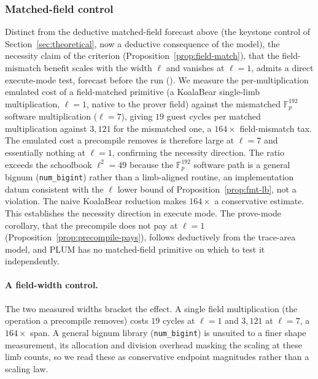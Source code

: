 \subsubsection{Matched-field control}
Distinct from the deductive matched-field forecast above (the keystone control of Section~\ref{sec:theoretical}, now a deductive consequence of the model), the necessity claim of the criterion (Proposition~\ref{prop:field-match}), that the field-mismatch benefit scales with the width $\ell$ and vanishes at $\ell=1$, admits a direct execute-mode test, forecast before the run (). We measure the per-multiplication emulated cost of a field-matched primitive (a KoalaBear single-limb multiplication, $\ell=1$, native to the prover field) against the mismatched $\mathbb{F}_p^{192}$ software multiplication ($\ell=7$), giving $19$ guest cycles per matched multiplication against $3{,}121$ for the mismatched one, a $164\times$ field-mismatch tax. The emulated cost a precompile removes is therefore large at $\ell=7$ and essentially nothing at $\ell=1$, confirming the necessity direction. The ratio exceeds the schoolbook $\ell^2=49$ because the $\mathbb{F}_p^{192}$ software path is a general bignum (\texttt{num\_bigint}) rather than a limb-aligned routine, an implementation datum consistent with the $\ell$ lower bound of Proposition~\ref{prop:fmt-lb}, not a violation. The naive KoalaBear reduction makes $164\times$ a conservative estimate. This establishes the necessity direction in execute mode. The prove-mode corollary, that the precompile does not pay at $\ell=1$ (Proposition~\ref{prop:precompile-pays}), follows deductively from the trace-area model, and PLUM has no matched-field primitive on which to test it independently.

\paragraph{A field-width control.} The two measured widths bracket the effect. A
single field multiplication (the operation a precompile removes) costs $19$ cycles at $\ell=1$ and $3{,}121$ at $\ell=7$, a $164\times$ span. A general bignum library (\texttt{num\_bigint}) is unsuited to a finer shape measurement, its allocation and division overhead masking the scaling at these limb counts, so we read these as conservative endpoint magnitudes rather than a scaling law.

